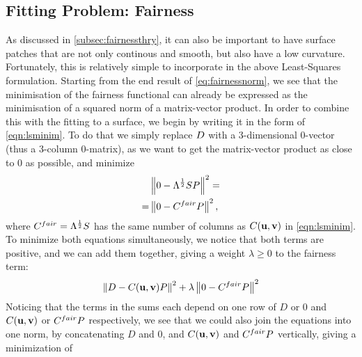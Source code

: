\subsection{Fitting Problem: Fairness}
\label{subsec:lsqfairness}
As discussed in \autoref{subsec:fairnessthry}, it can also be important to have surface patches that are not only continous and smooth, but also have a low curvature. Fortunately, this is relatively simple to incorporate in the above Least-Squares formulation. Starting from the end result of \autoref{eq:fairnessnorm}, we see that the minimisation of the fairness functional can already be expressed as the minimisation of a squared norm of a matrix-vector product. In order to combine this with the fitting to a surface, we begin by writing it in the form of \autoref{eqn:lsminim}. To do that we simply replace $\lsDataPointMatrix$ with a 3-dimensional $0$-vector (thus a 3-column $0$-matrix), as we want to get the matrix-vector product as close to $0$ as possible, and minimize
\begin{align*}
\phantom{=}& \norm{0 - \Lambda^{\frac{1}{2}} S \lsControlPointMatrix}^2 =
\\
=& \norm{0 - \lsControlPointCoefMatrix^{fair}\lsControlPointMatrix}^2,
\end{align*}
where $\lsControlPointCoefMatrix^{fair} = \Lambda^{\frac{1}{2}} S$ has the same number of columns as $\lsControlPointCoefMatrix(\vec{u},\vec{v})$ in \autoref{eqn:lsminim}. %
To minimize both equations simultaneously, we notice that both terms are positive, and we can add them together, giving a weight $\lambda \geq 0$ to the fairness term:
\begin{equation}
\norm{\lsDataPointMatrix - \lsControlPointCoefMatrix(\vec{u},\vec{v}) \lsControlPointMatrix }^2 + \lambda \norm{0 - \lsControlPointCoefMatrix^{fair}\lsControlPointMatrix }^2
\end{equation}
Noticing that the terms in the sums each depend on one row of $D$ or $0$ and $\lsControlPointCoefMatrix(\vec{u},\vec{v})$ or $\lsControlPointCoefMatrix^{fair}\lsControlPointMatrix$ respectively, we see that we could also join the equations into one norm, by concatenating $D$ and $0$, and $\lsControlPointCoefMatrix(\vec{u},\vec{v})$ and $\lsControlPointCoefMatrix^{fair}\lsControlPointMatrix$ vertically, giving a minimization of

